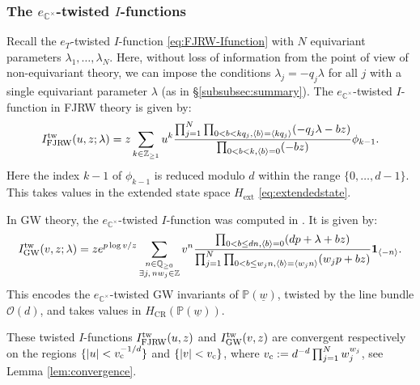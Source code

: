 \documentclass[11pt]{amsart}
\theoremstyle{definition} %
\theoremstyle{remark} %
\newcommand{\CC}{\mathbb C}
\newcommand{\PP}{\mathbb P}
\newcommand{\QQ}{\mathbb Q}
\newcommand{\ZZ}{\mathbb Z}
\newcommand{\la}{\lambda}
\newcommand{\tw}{{\rm tw}}
\def\GW{\operatorname{\text{GW}}}
\def\CR{\operatorname{\text{CR}}}
\def\fracp#1{\left\langle #1 \right\rangle}
\newcommand{\cO}{\mathcal{O}}
\newcommand{\unit}{\boldsymbol{1}}
\newcommand{\ext}{{\operatorname{ext}}}
\newcommand{\FJRW}{{\operatorname{FJRW}}}
\renewcommand{\GW}{{\operatorname{GW}}}
\renewcommand{\CR}{{\operatorname{CR}}}
\newcommand{\vc}{v_{\rm c}}
\newcommand{\uw}{\underline{w}}
\begin{document}
\subsubsection{The $e_{\CC^\times}$-twisted $I$-functions} 
\label{subsubsect:Ifunct}
Recall the $e_T$-twisted $I$-function  \eqref{eq:FJRW-Ifunction}
with $N$ equivariant parameters $\lambda_1,\dots,\lambda_N$.  
Here, without loss of information from the point of view of 
non-equivariant theory,  
we can impose the conditions $\lambda_j= -q_j \lambda$ for all $j$ 
with a single equivariant parameter $\lambda$ 
(as in \S \ref{subsubsec:summary}). 
The $e_{\CC^\times}$-twisted $I$-function in FJRW theory 
is given by: 
\[
I^\tw_{\FJRW}(u,z;\lambda)=
z\sum_{k\in \ZZ_{\ge 1}} u^k 
\frac{\prod_{j=1}^N\prod_{ 
0< b<kq_j, \fracp{b} =\fracp{kq_j}} 
(-q_j \lambda-bz)}
{\prod_{ 0< b< k, \fracp{b} =0}(-bz)} \phi_{k-1}.
\]
Here the index $k-1$ of $\phi_{k-1}$ is reduced modulo $d$ 
within the range $\{0,\dots,d-1\}$. 
This takes values in the extended state space $H_{\ext}$ 
\eqref{eq:extendedstate}. 

In GW theory, the $e_{\CC^\times}$-twisted
$I$-function was computed in \cite{CCLT}.  
It is given by: 
\[
I^\tw_{\GW}(v,z;\lambda)= 
ze^{p\log v/z} 
\sum_{\substack{n\in \QQ_{\ge 0} \\ 
\exists j, \, nw_j\in \ZZ}}
v^{n} 
\frac{\prod_{0< b \le dn, \fracp{b} = 0} (dp+\lambda+bz)}
{\prod_{j=1}^N 
\prod_{0< b\le w_j n, \fracp{b} = \fracp{w_j n} } 
(w_jp+bz)}
\unit_{\langle -n\rangle}.
\]
This encodes the $e_{\CC^\times}$-twisted GW 
invariants of $\PP(\uw)$, twisted by the line bundle $\cO(d)$,  
and takes values in $H_{\CR}(\PP(\uw))$. 

These twisted $I$-functions $I^{\tw}_{\FJRW}(u,z)$ and $I^{\tw}_{\GW}(v,z)$ 
are convergent respectively on the regions $\{|u|<\vc^{-1/d}\}$ 
and $\{|v|<\vc\}$, where $\vc:= d^{-d}\prod_{j=1}^N w_j^{w_j}$, 
see Lemma \ref{lem:convergence}.  

%
%
\end{document}

